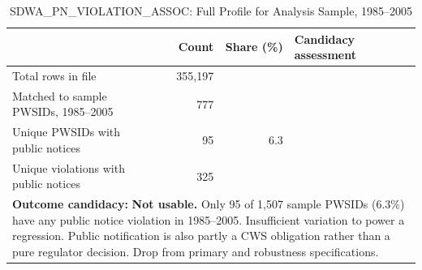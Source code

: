 \begin{table}[h!]
\centering
\caption{SDWA\_PN\_VIOLATION\_ASSOC: Full Profile for Analysis Sample, 1985--2005}
\label{tab:profile_pn}
\small
\begin{tabular}{p{5.5cm}rrl}
\hline\hline
 & Count & Share (\%) & Candidacy assessment \\
\hline
Total rows in file & 355,197 & & \\
Matched to sample PWSIDs, 1985--2005 & 777 & & \\
Unique PWSIDs with public notices & 95 & 6.3 & \\
Unique violations with public notices & 325 & & \\
\hline\hline
\multicolumn{4}{p{13cm}}{\footnotesize \textbf{Outcome candidacy:} \textbf{Not usable.} Only 95 of 1,507 sample PWSIDs (6.3\%) have any public notice violation in 1985--2005. Insufficient variation to power a regression. Public notification is also partly a CWS obligation rather than a pure regulator decision. Drop from primary and robustness specifications.} \\
\end{tabular}
\end{table}
